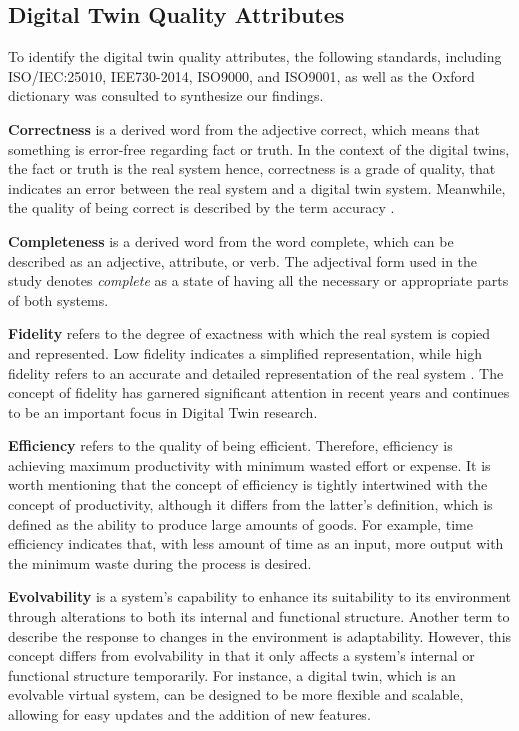 \documentclass{llncs}
\begin{document}
    \subsection{Digital Twin Quality Attributes}\label{section:Digital Twin Quality Attributes}
    To identify the digital twin quality attributes, the following standards, including ISO/IEC:25010, IEE730-2014, ISO9000, and ISO9001, 
    as well as the Oxford dictionary was consulted to 
    synthesize our findings\cite{ISO9000,ISO90012015,ISO/IEC:25010,IEE730-2014, OxfordDictionary}.
    
    \textbf{Correctness} is a  derived word from the adjective correct, which means that something is error-free regarding fact or truth. 
    In the context of the digital twins, the fact or truth is the real system hence, correctness is a grade of quality, 
    that indicates an error between the real system and a digital twin system.
    Meanwhile, the quality of being correct is described by the term accuracy \cite{OxfordDictionary}. 
    
    \textbf{Completeness} is a derived word from the word complete, which can be described as an adjective, attribute, or verb\cite{OxfordDictionary}. 
    The adjectival form used in the study denotes \textit{complete} as a state of having all the necessary or appropriate parts of both systems\cite{OxfordDictionary}.

    \textbf{Fidelity} refers to the degree of exactness with which the real system is copied and represented. 
    Low fidelity indicates a simplified representation, while high fidelity refers to an accurate and detailed representation of the real system \cite{Review2}. 
    The concept of fidelity has garnered significant attention in recent
    years and continues to be an important focus in Digital Twin research\cite{Review2}\cite{Review1}.

    \textbf{Efficiency} refers to the quality of being efficient\cite{OxfordDictionary}. Therefore, efficiency is achieving
    maximum productivity with minimum wasted effort or expense. It is worth mentioning that the concept of efficiency is tightly intertwined with the concept of productivity, 
    although it differs from the latter's definition, which is defined as the ability to produce large amounts of goods\cite{OxfordDictionary}.  
    For example, time efficiency indicates that,  with less amount of time as an input, more output with the minimum waste during the process is desired. 

    \textbf{Evolvability} is a system's capability to enhance its suitability to its environment through alterations to both its internal and functional 
    structure\cite{MobusSystemTheory}. Another term to describe the response to changes in the environment is adaptability.
    However, this concept differs from evolvability in that it only affects a system's internal or functional structure temporarily. 
    For instance, a digital twin, which is an evolvable virtual system, can be designed to be more flexible and scalable, 
    allowing for easy updates and the addition of new features\cite{ZHANGUPDATEMETHOD}.
    
\end{document}
